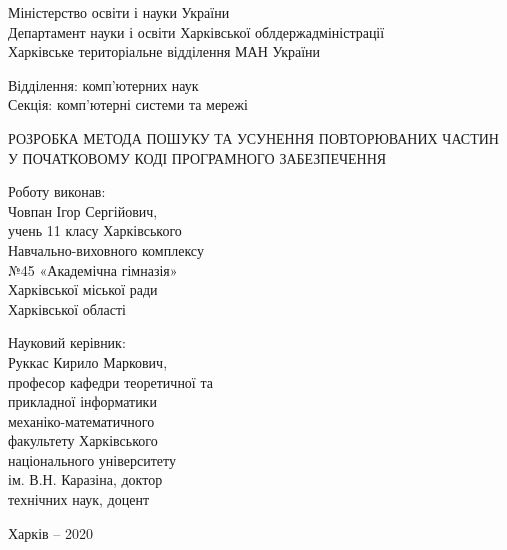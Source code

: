 \documentclass[a4paper, 14pt]{article}
\begin{document}
\thispagestyle{empty}
\begin{spacing}{1}
\begin{center}
Міністерство освіти і науки України\\
Департамент науки і освіти Харківської облдержадміністрації\\
Харківське територіальне відділення МАН України\\
\end{center}\par\null\par
\begin{changemargin}{10cm}{0cm}
Відділення: комп'ютерних наук\\
Секція: комп'ютерні системи та мережі
\end{changemargin}\par\null\par
\begin{center}
РОЗРОБКА МЕТОДА ПОШУКУ ТА УСУНЕННЯ ПОВТОРЮВАНИХ ЧАСТИН 
У ПОЧАТКОВОМУ КОДІ ПРОГРАМНОГО ЗАБЕЗПЕЧЕННЯ
\end{center}\par\null\par\null
\begin{changemargin}{10cm}{0cm}
Роботу виконав:\\ 
Човпан Ігор Сергійович,\\
учень 11 класу Харківського\\
Навчально-виховного комплексу\\
№45 «Академічна гімназія»\\
Харківської міської ради\\
Харківської області
\end{changemargin}\par
\begin{changemargin}{10cm}{0cm}
Науковий керівник:\\
Руккас Кирило Маркович,\\
професор кафедри теоретичної та\\
прикладної інформатики\\
механіко-математичного\\
факультету Харківського\\
національного університету\\
ім. В.Н. Каразіна, доктор\\
технічних наук, доцент\\
\vspace*{\fill}\end{changemargin}
\begin{center}
Харків -- 2020
\end{center}\end{spacing}
\end{document}
